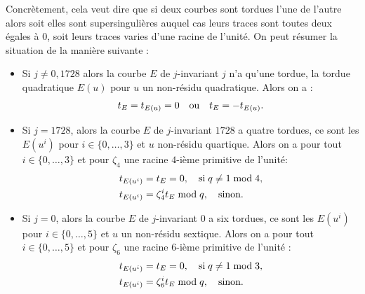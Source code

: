 \documentclass[a4paper]{article} %
\numberwithin{section}{part}
\numberwithin{equation}{section}
\newcommand\nroot[1]{\textit{#1}-ième}
\begin{document}
Concrètement, cela veut dire que si deux courbes sont tordues l'une de l'autre 
alors soit elles sont supersingulières auquel cas leurs traces sont toutes deux 
égales à $0$, soit leurs traces varies d'une racine de l'unité. On peut résumer 
la situation de la manière suivante :
\vspace{0.3cm}
\begin{itemize}
    \item Si $j\neq0, 1728$ alors la courbe $E$ de $j$-invariant $j$ n'a qu'une 
    tordue, la tordue quadratique $E(u)$ pour $u$ un non-résidu quadratique. 
    Alors on a :
    \begin{equation}
    t_E = t_{E(u)} = 0\quad\textup{ou}\quad t_E = -t_{E(u)}.
    \end{equation}

    \item Si $j = 1728$, alors la courbe $E$ de $j$-invariant $1728$ a quatre
    tordues, ce sont les $E(u^i)$ pour $i\in\lbrace{0,\dots,3}\rbrace$ et $u$
    non-résidu quartique. Alors on a pour tout $i\in\lbrace{0,\dots,3}\rbrace$ 
    et pour $\zeta_4$ une racine \nroot{$4$} primitive de l'unité:
        \begin{align}
        t_{E(u^i)} &= t_E = 0,\quad\textup{si\;}q\neq1\bmod4,\\
        t_{E(u^i)} &= \zeta_4^it_E\bmod q,\quad\textup{sinon.}
        \end{align}

    \item Si $j = 0$, alors la courbe $E$ de $j$-invariant $0$ a six tordues, ce
    sont les $E(u^i)$ pour $i\in\lbrace{0,\dots,5}\rbrace$ et $u$ un non-résidu
    sextique. Alors on a pour tout $i\in\lbrace{0,\dots,5}\rbrace$ et pour
    $\zeta_6$ une racine \nroot{$6$} primitive de l'unité :
        \begin{align}
        t_{E(u^i)} &= t_E = 0,\quad\textup{si\;}q\neq1\bmod3,\\
        t_{E(u^i)} &= \zeta_6^it_E\bmod q,\quad\textup{sinon.}
        \end{align}
\end{itemize}
\end{document}
